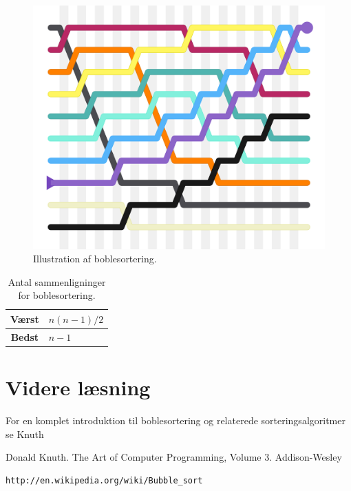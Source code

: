\documentclass[a4paper]{article}
\begin{document}
\begin{figure}
	\centering
	\includegraphics[width=0.4\linewidth]{Bubblesort.png}
	\caption{Illustration af boblesortering.}
	\label{fig:bubblesort}
\end{figure}

\begin{table}[h!]
	\begin{center}
		
		\label{tab:table1}
		\begin{tabular}{|c|l|} %
			\hline
			\textbf{Værst} & \(n(n - 1)/2\)\\
			\hline
			\textbf{Bedst} & \(n-1\) \\
			\hline
		\end{tabular}
	
	\end{center}
	\caption{Antal sammenligninger for boblesortering.}
\end{table}

\section{Videre læsning}
For en komplet introduktion til boblesortering og relaterede sorteringsalgoritmer
se Knuth \cite{DonaldKnuthTAOCP}

\begin{thebibliography}{99}

  Donald Knuth.
  The Art of Computer Programming,
  Volume 3.
  Addison-Wesley

\begin{verbatim}
http://en.wikipedia.org/wiki/Bubble_sort
\end{verbatim}

\end{thebibliography}
\end{document}
